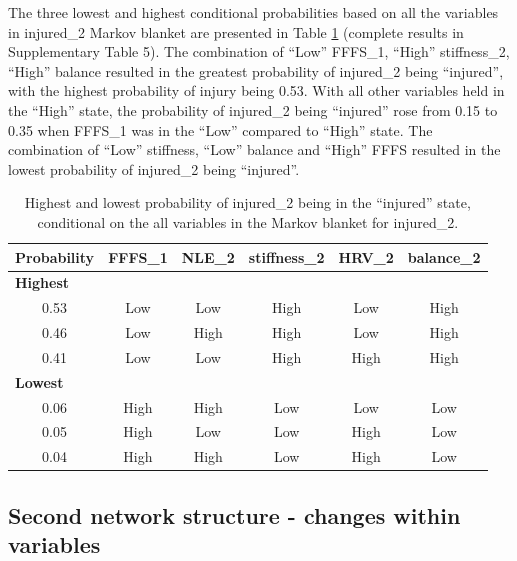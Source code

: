 \documentclass[
  english,
  man]{apa6}
\begin{document}
The three lowest and highest conditional probabilities based on all the variables in injured\_2 Markov blanket are presented in Table \ref{tab:table7} (complete results in Supplementary Table 5).
The combination of ``Low'' FFFS\_1, ``High'' stiffness\_2, ``High'' balance resulted in the greatest probability of injured\_2 being ``injured'', with the highest probability of injury being 0.53.
With all other variables held in the ``High'' state, the probability of injured\_2 being ``injured'' rose from 0.15 to 0.35 when FFFS\_1 was in the ``Low'' compared to ``High'' state.
The combination of ``Low'' stiffness, ``Low'' balance and ``High'' FFFS resulted in the lowest probability of injured\_2 being ``injured''.

\begin{table}[H]

\caption{\label{tab:table7}Highest and lowest probability of injured\_2 being in the ``injured'' state, conditional on the all variables in the Markov blanket for injured\_2.}
\centering
\begin{tabular}[t]{c|c|c|c|c|c}
\hline
\textbf{Probability} & \textbf{FFFS\_1} & \textbf{NLE\_2} & \textbf{stiffness\_2} & \textbf{HRV\_2} & \textbf{balance\_2}\\
\hline
\multicolumn{6}{l}{\textbf{Highest}}\\
\hline
\hspace{1em}0.53 & Low & Low & High & Low & High\\
\hline
\hspace{1em}0.46 & Low & High & High & Low & High\\
\hline
\hspace{1em}0.41 & Low & Low & High & High & High\\
\hline
\multicolumn{6}{l}{\textbf{Lowest}}\\
\hline
\hspace{1em}0.06 & High & High & Low & Low & Low\\
\hline
\hspace{1em}0.05 & High & Low & Low & High & Low\\
\hline
\hspace{1em}0.04 & High & High & Low & High & Low\\
\hline
\end{tabular}
\end{table}

\hypertarget{second-network-structure---changes-within-variables}{%
\subsection{Second network structure - changes within variables}\label{second-network-structure---changes-within-variables}}
\end{document}

